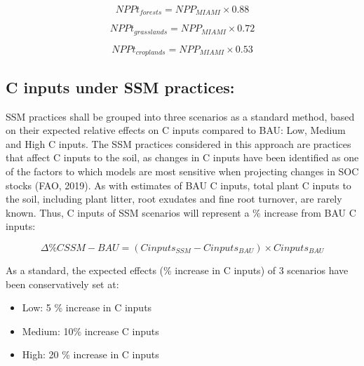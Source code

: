 \documentclass[
  10pt,
  b5paper,
]{book}
\providecommand{\tightlist}{%
  \setlength{\itemsep}{0pt}\setlength{\parskip}{0pt}}
\begin{document}
\begin{equation}
\tag{6.10}
NPPt_{forests} = NPP_{MIAMI} \times 0.88                 
\end{equation}

\begin{equation}
\tag{6.11}
NPPt_{grasslands} = NPP_{MIAMI} \times 0.72 
\end{equation}

\begin{equation}
\tag{6.12}
NPPt_{croplands} = NPP_{MIAMI} \times 0.53
\end{equation}

\hypertarget{c-inputs-under-ssm-practices}{%
\subsection{C inputs under SSM practices:}\label{c-inputs-under-ssm-practices}}

SSM practices shall be grouped into three scenarios as a standard method, based on their expected relative effects on C inputs compared to BAU: Low, Medium and High C inputs. The SSM practices considered in this approach are practices that affect C inputs to the soil, as changes in C inputs have been identified as one of the factors to which models are most sensitive when projecting changes in SOC stocks (FAO, 2019).
As with estimates of BAU C inputs, total plant C inputs to the soil, including plant litter, root exudates and fine root turnover, are rarely known. Thus, C inputs of SSM scenarios will represent a \% increase from BAU C inputs:

\begin{equation}
\tag{6.13}
    \Delta \% CSSM-BAU = (Cinputs_{SSM} - Cinputs_{BAU}) \times Cinputs_{BAU}
\end{equation}

As a standard, the expected effects (\% increase in C inputs) of 3 scenarios have been conservatively set at:

\begin{itemize}
\tightlist
\item
  Low: 5 \% increase in C inputs
\item
  Medium: 10\% increase C inputs
\item
  High: 20 \% increase in C inputs
\end{itemize}
\end{document}
